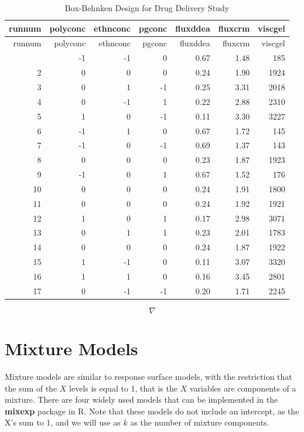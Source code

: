 \documentclass[
]{book}
\begin{document}
\begin{longtable}[]{@{}rrrrrrr@{}}
\caption{Box-Behnken Design for Drug Delivery Study}\tabularnewline
\toprule\noalign{}
runnum & polyconc & ethnconc & pgconc & fluxddea & fluxcrm & viscgel \\
\midrule\noalign{}
\endfirsthead
\toprule\noalign{}
runnum & polyconc & ethnconc & pgconc & fluxddea & fluxcrm & viscgel \\
\midrule\noalign{}
\endhead
\bottomrule\noalign{}
\endlastfoot
1 & -1 & -1 & 0 & 0.67 & 1.48 & 185 \\
2 & 0 & 0 & 0 & 0.24 & 1.90 & 1924 \\
3 & 0 & 1 & -1 & 0.25 & 3.31 & 2018 \\
4 & 0 & -1 & 1 & 0.22 & 2.88 & 2310 \\
5 & 1 & 0 & -1 & 0.11 & 3.30 & 3227 \\
6 & -1 & 1 & 0 & 0.67 & 1.72 & 145 \\
7 & -1 & 0 & -1 & 0.69 & 1.37 & 143 \\
8 & 0 & 0 & 0 & 0.23 & 1.87 & 1923 \\
9 & -1 & 0 & 1 & 0.67 & 1.52 & 176 \\
10 & 0 & 0 & 0 & 0.24 & 1.91 & 1800 \\
11 & 0 & 0 & 0 & 0.24 & 1.92 & 1921 \\
12 & 1 & 0 & 1 & 0.17 & 2.98 & 3071 \\
13 & 0 & 1 & 1 & 0.23 & 2.01 & 1783 \\
14 & 0 & 0 & 0 & 0.24 & 1.87 & 1922 \\
15 & 1 & -1 & 0 & 0.11 & 3.07 & 3320 \\
16 & 1 & 1 & 0 & 0.16 & 3.45 & 2801 \\
17 & 0 & -1 & -1 & 0.20 & 1.71 & 2245 \\
\end{longtable}

\[\nabla\]

\section{Mixture Models}\label{mixture-models}

Mixture models are similar to response surface models, with the
restriction that the sum of the \(X\) levels is equal to 1, that is the
\(X\) variables are components of a mixture. There are four widely used
models that can be implemented in the \textbf{mixexp} package in R. Note
that these models do not include an intercept, as the X's sum to 1, and
we will use as \(k\) as the number of mixture components.
\end{document}
